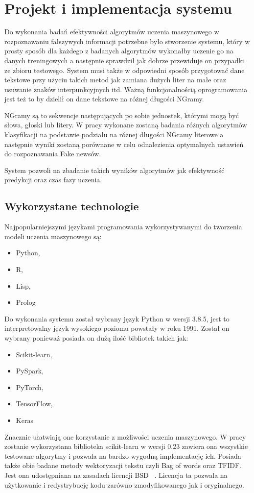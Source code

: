 \chapter{Projekt i implementacja systemu}
Do wykonania badań efektywności algorytmów uczenia maszynowego w rozpoznawaniu
fałszywych informacji potrzebne było stworzenie systemu, który w prosty sposób 
dla każdego z badanych algorytmów wykonałby uczenie go na danych treningowych 
a następnie sprawdził jak dobrze przewiduje on przypadki ze zbioru testowego.
System musi także w odpowiedni sposób przygotować dane tekstowe przy użyciu takich
metod jak zamiana dużych liter na małe oraz usuwanie znaków interpunkcyjnych itd.
Ważną funkcjonalnością oprogramowania jest też to by dzielił on dane tekstowe na 
różnej długości NGramy. 

NGramy są to sekwencje następujących po sobie jednostek, którymi mogą być słowa, 
głoski lub litery. W pracy wykonane zostaną badania różnych algorytmów klasyfikacji
na podstawie podziału na różnej długości NGramy literowe a następnie wyniki zostaną
porównane w celu odnalezienia optymalnych ustawień do rozpoznawania Fake newsów.

System pozwoli na zbadanie takich wyników algorytmów jak efektywność predykcji oraz 
czas fazy uczenia.

\section{Wykorzystane technologie}
Najpopularniejszymi językami programowania wykorzystywanymi do tworzenia modeli uczenia
maszynowego są:
\begin{itemize}
    \item Python,
    \item R,
    \item Lisp,
    \item Prolog
\end{itemize}
Do wykonania systemu został wybrany język Python w wersji 3.8.5, jest to interpretowalny
język wysokiego poziomu powstały w roku 1991. Został on wybrany 
ponieważ posiada on dużą ilość bibliotek takich jak: 
\begin{itemize}
    \item Scikit-learn,
    \item PySpark,
    \item PyTorch,
    \item TensorFlow,
    \item Keras
\end{itemize}
Znacznie ułatwiają one korzystanie z możliwości uczenia maszynowego.
W pracy zostanie wykorzystana biblioteka scikit-learn w wersji 0.23 zawiera ona wszystkie 
testowane algorytmy i pozwala na bardzo wygodną implementację ich. Posiada także obie 
badane metody wektoryzacji tekstu czyli Bag of words oraz TFIDF. Jest ona udostępniana na zasadach licencji BSD ~\cite{scikitlearn}. 
Licencja ta pozwala na użytkowanie i redystrybucję kodu zarówno zmodyfikowanego jak i oryginalnego.

